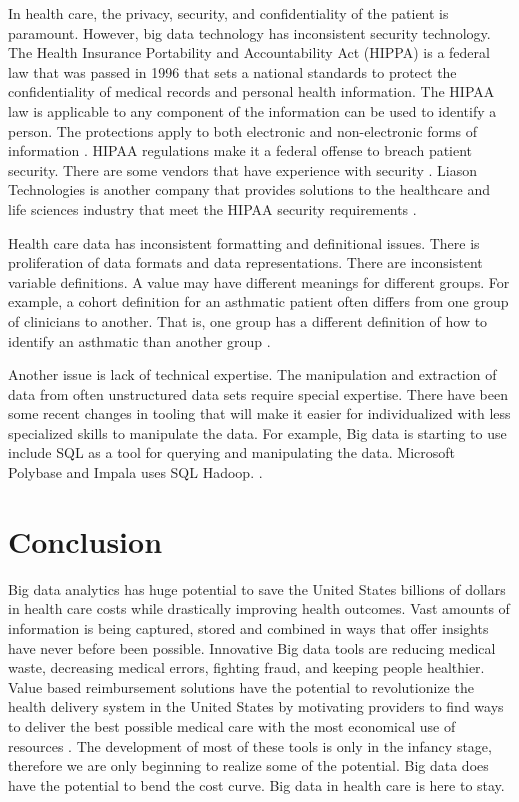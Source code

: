 \documentclass[sigconf]{acmart}
\begin{document}
{{{ In health care, the privacy, security, and confidentiality of the patient is paramount. However, big data technology has inconsistent security technology.  The Health Insurance Portability and Accountability Act (HIPPA) is a federal law that was passed in 1996 that sets a national standards to protect the confidentiality of medical records and personal health information. The HIPAA law is applicable to any component of the information can be used to identify a person. The protections apply to both electronic and non-electronic forms of information \cite{HIPAA}. HIPAA regulations make it a federal offense to breach patient security.  There are some vendors that have experience with security \cite{www-google-HlthCat}. Liason Technologies is another company that provides solutions to the healthcare and life sciences industry that meet the HIPAA security requirements \cite{www-google-McDonald}.
 
Health care data has inconsistent formatting and definitional issues. There is proliferation of data formats and data representations. There are inconsistent variable definitions. A value may have different meanings for different groups. For example, a cohort definition for an asthmatic patient often differs from one group of clinicians to another. That is, one group has a different definition of how to identify an asthmatic than another group \cite{www-google-reas}. 

Another issue is lack of technical expertise. The manipulation and extraction of data from often unstructured data sets require special expertise. There have been some recent changes in tooling that will make it easier for individualized with less specialized skills to manipulate the data. For example, Big data is starting to use include SQL as a tool for querying and manipulating the data. Microsoft Polybase and Impala uses SQL Hadoop.  
. 
 

\section{Conclusion}
Big data analytics has huge potential to save the United States billions of dollars in health care costs while drastically improving health outcomes.  Vast amounts of information is being captured, stored and combined in ways that offer insights have never before been possible.  Innovative Big data tools are reducing medical waste, decreasing medical errors, fighting fraud, and keeping people healthier. Value based reimbursement solutions have the potential to revolutionize the health delivery system in the United States by motivating providers to find ways to deliver the best possible medical care with the most economical use of resources . The development of most of these tools is only in the infancy stage, therefore we are only beginning to realize some of the potential. Big data does have the potential to bend the cost curve. Big data in health care is here to stay.  







}}}
\end{document}
